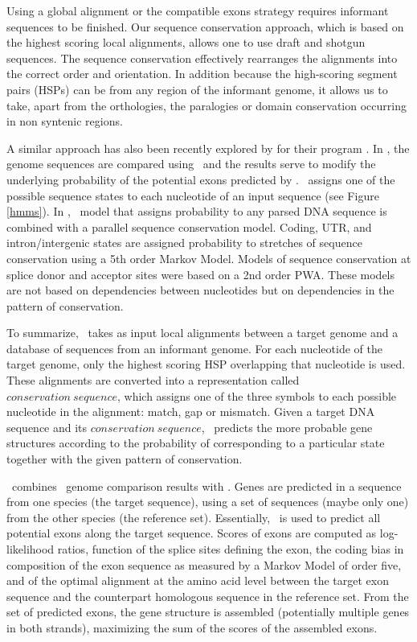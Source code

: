 Using a global alignment or the compatible exons strategy requires
informant sequences to be finished. Our sequence conservation
approach, which is based on the highest scoring local alignments,
allows one to use draft and shotgun sequences. The sequence
conservation effectively rearranges the alignments into the correct
order and orientation. In addition because the high-scoring segment
pairs (HSPs) can be from any region of the informant genome, it allows
us to take, apart from the orthologies, the paralogies or domain
conservation occurring in non syntenic regions.

A similar approach has also been recently explored by
\cite{korf:2001a} for their program \twinscan. In \twinscan, the
genome sequences are compared using \bln\ and the results serve to
modify the underlying probability of the potential exons predicted by
\genscan. \genscan\ assigns one of the possible sequence states to each 
nucleotide of an input sequence (see Figure \ref{hmms}). In \twinscan,
\genscan\ model that assigns probability to any parsed DNA sequence is
combined with a parallel sequence conservation model. Coding, UTR, and
intron/intergenic states are assigned probability to stretches of sequence
conservation using a 5th order Markov Model. Models of sequence
conservation at splice donor and acceptor sites were based on a 2nd
order PWA. These models are not based on dependencies between
nucleotides but on dependencies in the pattern of conservation.

To summarize, \twinscan\ takes as input local alignments between a target
genome and a database of sequences from an informant genome. For each
nucleotide of the target genome, only the highest scoring HSP
overlapping that nucleotide is used. These alignments are converted
into a representation called $conservation\ sequence$, which assigns
one of the three symbols to each possible nucleotide in the alignment:
match, gap or mismatch. Given a target DNA sequence and its
$conservation\ sequence$, \twinscan\ predicts the more probable gene
structures according to the probability of corresponding to a particular
state together with the given pattern of conservation.

\sgp\ combines \tbx\ genome comparison results with \geneid. Genes 
are predicted in a sequence from one species (the target sequence),
using a set of sequences (maybe only one) from the other species (the
reference set).  Essentially, \geneid\ is used to predict all
potential exons along the target sequence. Scores of exons are
computed as log-likelihood ratios, function of the splice sites
defining the exon, the coding bias in composition of the exon sequence
as measured by a Markov Model of order five, and of the optimal
alignment at the amino acid level between the target exon sequence and
the counterpart homologous sequence in the reference set. From the set
of predicted exons, the gene structure is assembled (potentially
multiple genes in both strands), maximizing the sum of the scores of
the assembled exons.

